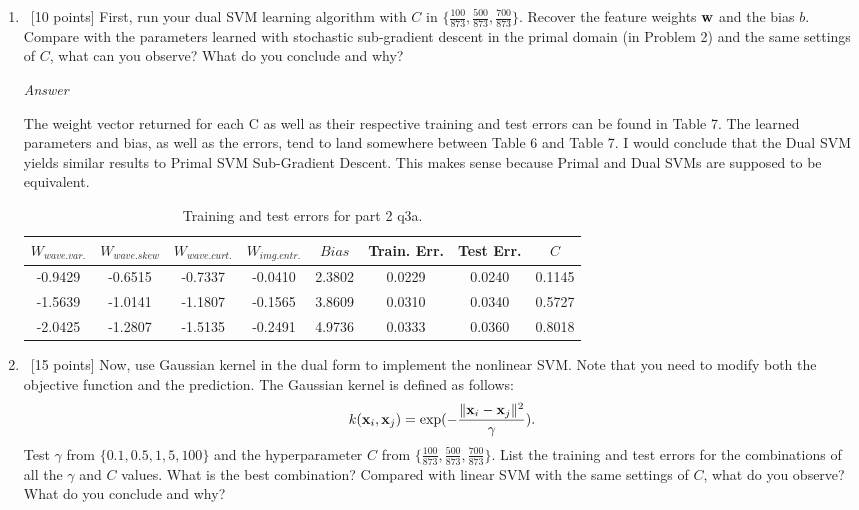 \documentclass[12pt, fullpage,letterpaper]{article}
\begin{document}
\begin{enumerate}
\begin{enumerate}
	\item ~[10 points] First, run your dual SVM learning algorithm with   $C$ in $\{\frac{100}{873}, \frac{500}{873}, \frac{700}{873}\}$. Recover the feature weights ${\bf w}$ and the bias $b$. Compare with the parameters learned with stochastic sub-gradient descent in the primal domain (in Problem 2) and the same settings of $C$, what can you observe? What do you conclude and why?
	
	\emph{Answer}
	
	The weight vector returned for each C as well as their respective training and test errors can be found in Table 7. The learned parameters and bias, as well as the errors, tend to land somewhere between Table 6 and Table 7. I would conclude that the Dual SVM yields similar results to Primal SVM Sub-Gradient Descent. This makes sense because Primal and Dual SVMs are supposed to be equivalent.
	
	\begin{table}[h]
		\centering
		\begin{tabular}{ccccccc|c}
    		$W_{wave.var.}$ & $W_{wave.skew}$ & $W_{wave.curt.}$ & $W_{img.entr.}$ & $Bias$ & Train. Err. & Test Err. & $C$ \\
    		\hline\hline
            -0.9429 & -0.6515 & -0.7337 & -0.0410 & 2.3802 & 0.0229 & 0.0240 & 0.1145 \\ \hline
            -1.5639 & -1.0141 & -1.1807 & -0.1565 & 3.8609 & 0.0310 & 0.0340 & 0.5727 \\ \hline
            -2.0425 & -1.2807 & -1.5135 & -0.2491 & 4.9736 & 0.0333 & 0.0360 & 0.8018 \\ \hline
		\end{tabular}
	\caption{Training and test errors for part 2 q3a.}
	\end{table}
	
	\item~[15 points] Now, use Gaussian kernel in the dual form to implement the nonlinear SVM. Note that you need to modify both the objective function and the prediction. The Gaussian kernel is defined as follows:
	\[
	k({\bf x}_i, {\bf x}_j) = \exp(-\frac{\|{\bf x}_i - {\bf x}_j\|^2}{\gamma}).
	\]
	Test $\gamma$ from $\{0.1, 0.5, 1,  5, 100\}$ and the hyperparameter $C$ from $\{ \frac{100}{873}, \frac{500}{873},  \frac{700}{873}\}$. List the training and test errors for the combinations of all the $\gamma$ and $C$ values. What is the best combination? Compared with linear SVM with the same settings of $C$, what do you observe? What do you conclude and why?  
	

\end{enumerate}
\end{enumerate}
\end{document}
